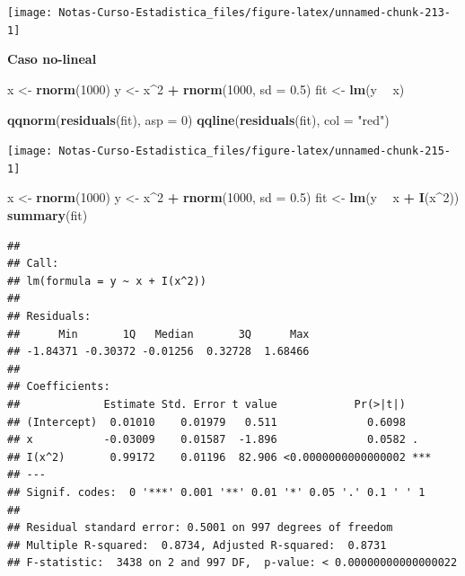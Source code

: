 \documentclass[
  12pt,
]{book}
\newenvironment{Shaded}{\begin{snugshade}}{\end{snugshade}}
\newcommand{\DataTypeTok}[1]{\textcolor[rgb]{0.13,0.29,0.53}{#1}}
\newcommand{\DecValTok}[1]{\textcolor[rgb]{0.00,0.00,0.81}{#1}}
\newcommand{\FloatTok}[1]{\textcolor[rgb]{0.00,0.00,0.81}{#1}}
\newcommand{\KeywordTok}[1]{\textcolor[rgb]{0.13,0.29,0.53}{\textbf{#1}}}
\newcommand{\NormalTok}[1]{#1}
\newcommand{\OperatorTok}[1]{\textcolor[rgb]{0.81,0.36,0.00}{\textbf{#1}}}
\newcommand{\StringTok}[1]{\textcolor[rgb]{0.31,0.60,0.02}{#1}}
\theoremstyle{definition}
\theoremstyle{definition}
\theoremstyle{definition}
\theoremstyle{remark}
\begin{document}
\begin{center}\texttt{[image: Notas-Curso-Estadistica\_files/figure-latex/unnamed-chunk-213-1]} \end{center}

\textbf{Caso no-lineal}

\begin{Shaded}
\begin{Highlighting}[]
\NormalTok{x <-}\StringTok{ }\KeywordTok{rnorm}\NormalTok{(}\DecValTok{1000}\NormalTok{)}
\NormalTok{y <-}\StringTok{ }\NormalTok{x}\OperatorTok{^}\DecValTok{2} \OperatorTok{+}\StringTok{ }\KeywordTok{rnorm}\NormalTok{(}\DecValTok{1000}\NormalTok{, }\DataTypeTok{sd =} \FloatTok{0.5}\NormalTok{)}
\NormalTok{fit <-}\StringTok{ }\KeywordTok{lm}\NormalTok{(y }\OperatorTok{~}\StringTok{ }\NormalTok{x)}
\end{Highlighting}
\end{Shaded}

\begin{Shaded}
\begin{Highlighting}[]
\KeywordTok{qqnorm}\NormalTok{(}\KeywordTok{residuals}\NormalTok{(fit), }\DataTypeTok{asp =} \DecValTok{0}\NormalTok{)}
\KeywordTok{qqline}\NormalTok{(}\KeywordTok{residuals}\NormalTok{(fit), }\DataTypeTok{col =} \StringTok{"red"}\NormalTok{)}
\end{Highlighting}
\end{Shaded}

\begin{center}\texttt{[image: Notas-Curso-Estadistica\_files/figure-latex/unnamed-chunk-215-1]} \end{center}

\begin{Shaded}
\begin{Highlighting}[]
\NormalTok{x <-}\StringTok{ }\KeywordTok{rnorm}\NormalTok{(}\DecValTok{1000}\NormalTok{)}
\NormalTok{y <-}\StringTok{ }\NormalTok{x}\OperatorTok{^}\DecValTok{2} \OperatorTok{+}\StringTok{ }\KeywordTok{rnorm}\NormalTok{(}\DecValTok{1000}\NormalTok{, }\DataTypeTok{sd =} \FloatTok{0.5}\NormalTok{)}
\NormalTok{fit <-}\StringTok{ }\KeywordTok{lm}\NormalTok{(y }\OperatorTok{~}\StringTok{ }\NormalTok{x }\OperatorTok{+}\StringTok{ }\KeywordTok{I}\NormalTok{(x}\OperatorTok{^}\DecValTok{2}\NormalTok{))}
\KeywordTok{summary}\NormalTok{(fit)}
\end{Highlighting}
\end{Shaded}

\begin{verbatim}
## 
## Call:
## lm(formula = y ~ x + I(x^2))
## 
## Residuals:
##      Min       1Q   Median       3Q      Max 
## -1.84371 -0.30372 -0.01256  0.32728  1.68466 
## 
## Coefficients:
##             Estimate Std. Error t value            Pr(>|t|)    
## (Intercept)  0.01010    0.01979   0.511              0.6098    
## x           -0.03009    0.01587  -1.896              0.0582 .  
## I(x^2)       0.99172    0.01196  82.906 <0.0000000000000002 ***
## ---
## Signif. codes:  0 '***' 0.001 '**' 0.01 '*' 0.05 '.' 0.1 ' ' 1
## 
## Residual standard error: 0.5001 on 997 degrees of freedom
## Multiple R-squared:  0.8734, Adjusted R-squared:  0.8731 
## F-statistic:  3438 on 2 and 997 DF,  p-value: < 0.00000000000000022
\end{verbatim}
\end{document}
